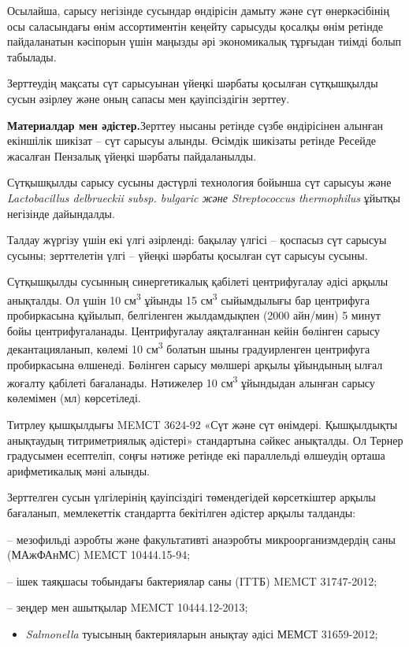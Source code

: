 {{Осылайша, сарысу негізінде сусындар өндірісін дамыту және сүт
өнеркәсібінің осы саласындағы өнім ассортиментін кеңейту сарысуды
қосалқы өнім ретінде пайдаланатын кәсіпорын үшін маңызды әрі
экономикалық тұрғыдан тиімді болып табылады.

Зерттеудің мақсаты сүт сарысуынан үйеңкі шәрбаты қосылған сүтқышқылды
сусын әзірлеу және оның сапасы мен қауіпсіздігін зерттеу.

{\bfseries Материалдар мен әдістер.}Зерттеу нысаны ретінде сүзбе
өндірісінен алынған екіншілік шикізат -- сүт сарысуы алынды. Өсімдік
шикізаты ретінде Ресейде жасалған Пензалық үйеңкі шәрбаты пайдаланылды.

Сүтқышқылды сарысу сусыны дәстүрлі технология бойынша сүт сарысуы және
\emph{Lactobacillus delbrueckii subsp. bulgaric және Streptococcus
thermophilus} ұйытқы негізінде дайындалды.

Талдау жүргізу үшін екі үлгі әзірленді: бақылау үлгісі -- қоспасыз сүт
сарысуы сусыны; зерттелетін үлгі -- үйеңкі шәрбаты қосылған сүт сарысуы
сусыны.

Сүтқышқылды сусынның синергетикалық қабілеті центрифугалау әдісі арқылы
анықталды. Ол үшін 10 см\textsuperscript{3} ұйынды 15
см\textsuperscript{3} сыйымдылығы бар центрифуга пробиркасына құйылып,
белгіленген жылдамдықпен (2000 айн/мин) 5 минут бойы центрифугаланады.
Центрифугалау аяқталғаннан кейін бөлінген сарысу декантацияланып, көлемі
10 см\textsuperscript{3} болатын шыны градуирленген центрифуга
пробиркасына өлшенеді. Бөлінген сарысу мөлшері арқылы ұйындының ылғал
жоғалту қабілеті бағаланады. Нәтижелер 10 см\textsuperscript{3}
ұйындыдан алынған сарысу көлемімен (мл) көрсетіледі.

Титрлеу қышқылдығы MEMСT 3624-92 «Сүт және сүт өнімдері. Қышқылдықты
анықтаудың титриметриялық әдістері» стандартына сәйкес анықталды. Ол
Тернер градусымен есептеліп, соңғы нәтиже ретінде екі параллельді
өлшеудің орташа арифметикалық мәні алынды.

Зерттелген сусын үлгілерінің қауіпсіздігі төмендегідей көрсеткіштер
арқылы бағаланып, мемлекеттік стандартта бекітілген әдістер арқылы
талданды:

-- мезофильді аэробты және факультативті анаэробты микроорганизмдердің
саны (МАжФАнМС) MEMСT 10444.15-94;

-- ішек таяқшасы тобындағы бактериялар саны (ITTБ) MEMСT 31747-2012;

-- зеңдер мен ашытқылар MEMСT 10444.12-2013;

\begin{itemize}
\item
  \emph{Salmonella} туысының бактерияларын анықтау әдісі МЕМСТ
  31659-2012;
\end{itemize}

}}
